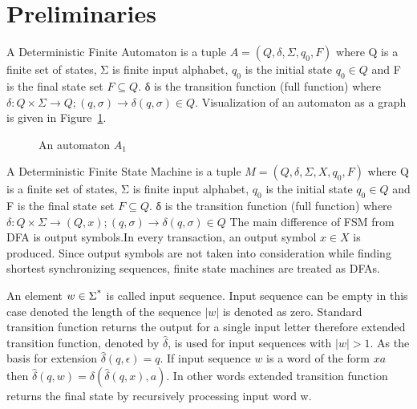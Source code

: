 \documentclass[12pt]{article}
\begin{document}
\section{Preliminaries}
\par A Deterministic Finite Automaton is a tuple $A = (Q,\delta, \Sigma, q_{0}, F)$ where Q is a finite set of states, Σ is finite input alphabet,  $q_{0}$ is the initial state $ q_{0} \in Q $ and F is the final state set $F \subseteq Q $. δ
is the transition function (full function) where $\delta: Q \times \Sigma \rightarrow Q ; (q,\sigma) \rightarrow \delta (q,\sigma) \in Q  $. Visualization of an automaton as a graph is given in Figure~\ref{fig:A0}.

\begin{figure}[ht]
	\centering
	\begin{minipage}{.5\textwidth}
		\centering
{}
\caption{An automaton $A_1$}\label{fig:A0}
\end{minipage}
\end{figure}
\par A Deterministic Finite State Machine is a tuple $M = (Q,\delta, \Sigma, X, q_{0}, F)$ where Q is a finite set of states, Σ is finite input alphabet,  $q_{0}$ is the initial state $ q_{0} \in Q $ and F is the final state set $F \subseteq Q $. δ
is the transition function (full function) where $\delta: Q \times \Sigma \rightarrow (Q, x) ; (q,\sigma) \rightarrow \delta (q,\sigma) \in Q  $ The main difference of FSM from DFA is output symbols.In every transaction, an output symbol $x \in X$ is produced. Since output symbols are not taken into consideration while finding shortest synchronizing sequences, finite state machines are treated as DFAs.

\par An element $w \in \Sigma \textsuperscript{*}$ is called input sequence. Input sequence can be empty in this case denoted the length of the sequence $|w|$ is denoted as zero. Standard transition function returns the output for a single input letter therefore extended transition function, denoted by $\hat{\delta}$, is used for input sequences with $|w| > 1$. As the basis for extension  $\hat{\delta} (q, \epsilon) = q$. If input sequence $w$ is a word of the form $xa$ then $\hat{\delta} (q, w) = \delta(\hat{\delta}(q, x), a)$. In other words extended transition function returns the final state by recursively processing input word w.
\end{document}
